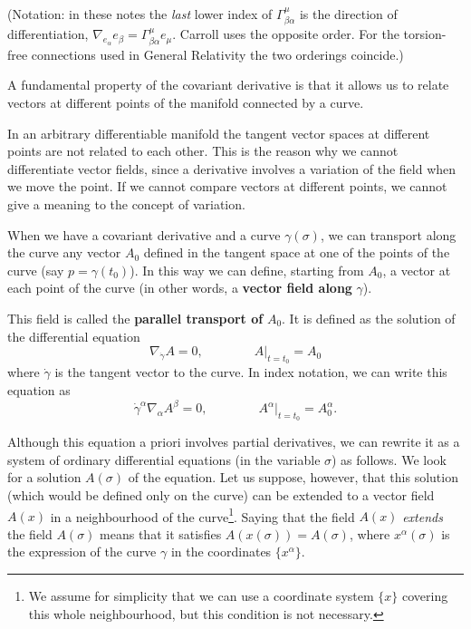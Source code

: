 \begin{points}
\begin{carroll}
(Notation: in these notes the \emph{last} lower index of $\Gamma^\mu_{\beta\alpha}$ is the direction of differentiation, $\nabla_{e_\alpha}e_\beta=\Gamma^\mu_{\beta\alpha}e_\mu$. Carroll uses the opposite order. For the torsion-free connections used in General Relativity the two orderings coincide.)
\end{carroll}


\item A fundamental property of the covariant derivative is that it allows us to relate vectors at different points of the manifold connected by a curve.

\item In an arbitrary differentiable manifold the tangent vector spaces at different points are not related to each other. This is the reason why we cannot differentiate vector fields, since a derivative involves a variation of the field when we move the point. If we cannot compare vectors at different points, we cannot give a meaning to the concept of variation.

\item When we have a covariant derivative and a curve $\gamma(\sigma)$, we can transport along the curve any vector $A_0$ defined in the tangent space at one of the points of the curve (say $p=\gamma(t_0)$). In this way we can define, starting from $A_0$, a vector at each point of the curve (in other words, a \textbf{vector field along} $\gamma$).

\item This field is called the \textbf{parallel transport of} $A_0$. It is defined as the solution of the differential equation
\[
  \nabla_{\dot\gamma}A=0,\qquad\qquad A|_{t=t_0}=A_0
\]
where $\dot\gamma$ is the tangent vector to the curve. In index notation, we can write this equation as
\[
  \dot\gamma^\alpha\nabla_\alpha A^\beta=0,\qquad\qquad A^\alpha|_{t=t_0}=A^\alpha_0 .
\]

\item Although this equation a priori involves partial derivatives, we can rewrite it as a system of ordinary differential equations (in the variable $\sigma$) as follows. We look for a solution $A(\sigma)$ of the equation. Let us suppose, however, that this solution (which would be defined only on the curve) can be extended to a vector field $A(x)$ in a neighbourhood of the curve\footnote{We assume for simplicity that we can use a coordinate system $\{x\}$ covering this whole neighbourhood, but this condition is not necessary.}. Saying that the field $A(x)$ \emph{extends} the field $A(\sigma)$ means that it satisfies $A(x(\sigma))=A(\sigma)$, where $x^\alpha(\sigma)$ is the expression of the curve $\gamma$ in the coordinates $\{x^\alpha\}$.


\end{points}
